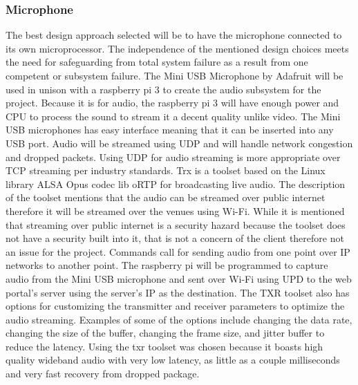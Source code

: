 \documentclass[onecolumn, draftclsnofoot,10pt, compsoc]{IEEEtran}
\begin{document}
        \subsubsection{Microphone}
        The best design approach selected will be to have the microphone connected to its own microprocessor.  
        The independence of the mentioned design choices meets the need for safeguarding from total system failure as a result from one competent or subsystem failure. 
        The Mini USB Microphone by Adafruit will be used in unison with a raspberry pi 3 to create the audio subsystem for the project. 
        Because it is for audio, the raspberry pi 3 will have enough power and CPU to process the sound to stream it a decent quality unlike video. 
        The Mini USB microphones has easy interface meaning that it can be inserted into any USB port. 
        Audio will be streamed using UDP and will handle network congestion and dropped packets. 
        Using UDP for audio streaming is more appropriate over TCP streaming per industry standards. 
        Trx is a toolset based on the Linux library ALSA Opus codec lib oRTP for broadcasting live audio. 
        The description of the toolset mentions that the audio can be streamed over public internet therefore it will be streamed over the venues using Wi-Fi. 
        While it is mentioned that streaming over public internet is a security hazard because the toolset does not have a security built into it, that is not a concern of the client therefore not an issue for the project. 
        Commands call for sending audio from one point over IP networks to another point. 
        The raspberry pi will be programmed to capture audio from the Mini USB microphone and sent over Wi-Fi using UPD to the web portal’s server using the server’s IP as the destination. 
        The TXR toolset also has options for customizing the transmitter and receiver parameters to optimize the audio streaming. 
        Examples of some of the options include changing the data rate, changing the size of the buffer, changing the frame size, and jitter buffer to reduce the latency.  
        Using the txr toolset was chosen because it boasts high quality wideband audio with very low latency, as little as a couple milliseconds and very fast recovery from dropped package.
        
\end{document}
